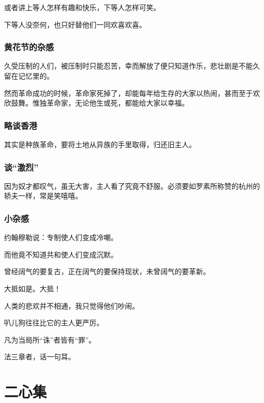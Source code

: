 \documentclass[a4paper]{ctexart}
\begin{document}
\begin{sloppy}
        或者讲上等人怎样有趣和快乐，下等人怎样可笑。
        
        下等人没奈何，也只好替他们一同欢喜欢喜。

        \section{
            黄花节的杂感
        }
        久受压制的人们，被压制时只能忍苦，幸而解放了便只知道作乐，悲壮剧是不能久留在记忆里的。

        然而革命成功的时候，革命家死掉了，却能每年给生存的大家以热闹，甚而至于欢欣鼓舞。惟独革命家，无论他生或死，都能给大家以幸福。

        \section{
            略谈香港
        }
        其实是种族革命，要将土地从异族的手里取得，归还旧主人。

        \section{
            谈“激烈”
        }
        因为奴才都叹气，虽无大害，主人看了究竟不舒服。必须要如罗素所称赞的杭州的轿夫一样，常是笑嘻嘻。

        \section{
            小杂感
        }
        约翰穆勒说：专制使人们变成冷嘲。

        而他竟不知道共和使人们变成沉默。

        \vspace{1em}
        曾经阔气的要复古，正在阔气的要保持现状，未曾阔气的要革新。

        大抵如是。大抵！

        \vspace{1em}
        人类的悲欢并不相通，我只觉得他们吵闹。

        \vspace{1em}
        叭儿狗往往比它的主人更严厉。

        \vspace{1em}
        凡为当局所“诛”者皆有“罪”。

        \vspace{1em}
        法三章者，话一句耳。

        \part{二心集}

\end{sloppy}
\end{document}
